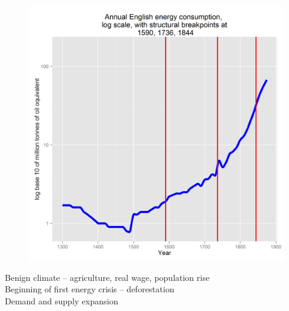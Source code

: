\documentclass[final]{beamer}
\begin{document}
\begin{frame}
\begin{figure}[p!]
{		\mbox{\includegraphics[height=0.5\textheight]{energyLog1}}
		}
		\end{figure} \vspace*{-0.4in}
Benign climate -- agriculture, real wage, population rise\\
Beginning of first energy crisis -- deforestation\\
Demand and supply expansion\\
\end{frame}
\end{document}

